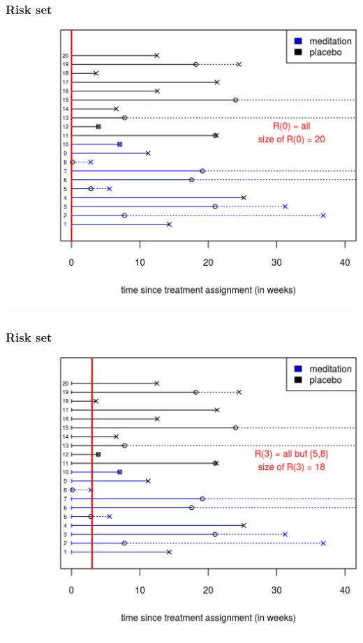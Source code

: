 \documentclass[10pt,t]{beamer}
\begin{document}
\begin{frame}
\frametitle{Risk set}
\begin{center}
\includegraphics[height=0.8\textheight]{figs/risk_set_movie_0.png}
\end{center}
\end{frame}

\begin{frame}
\frametitle{Risk set}
\begin{center}
\includegraphics[height=0.8\textheight]{figs/risk_set_movie_1.png}
\end{center}
\end{frame}
\end{document}
